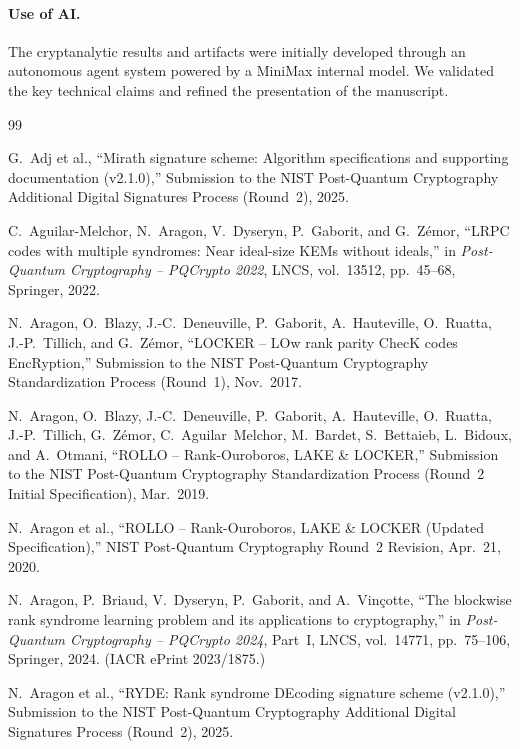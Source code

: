 \documentclass[11pt,a4paper]{article}
\theoremstyle{definition}
\theoremstyle{remark}
\begin{document}
\paragraph{Use of AI.}
The cryptanalytic results and artifacts were initially developed through an autonomous agent system powered by a MiniMax internal model. We validated the key technical claims and refined the presentation of the manuscript.

\begin{thebibliography}{99}

G.~Adj et al.,
``Mirath signature scheme: Algorithm specifications and supporting documentation (v2.1.0),'' Submission to the NIST Post-Quantum Cryptography Additional Digital Signatures Process (Round~2), 2025.

C.~Aguilar-Melchor, N.~Aragon, V.~Dyseryn, P.~Gaborit, and G.~Z\'{e}mor,
``LRPC codes with multiple syndromes: Near ideal-size KEMs without ideals,'' in \emph{Post-Quantum Cryptography -- PQCrypto 2022}, LNCS, vol.~13512, pp.~45--68, Springer, 2022.

N.~Aragon, O.~Blazy, J.-C.~Deneuville, P.~Gaborit, A.~Hauteville, O.~Ruatta, J.-P.~Tillich, and G.~Z\'{e}mor,
``LOCKER -- LOw rank parity ChecK codes EncRyption,'' Submission to the NIST Post-Quantum Cryptography Standardization Process (Round~1), Nov.~2017.

N.~Aragon, O.~Blazy, J.-C.~Deneuville, P.~Gaborit, A.~Hauteville, O.~Ruatta, J.-P.~Tillich, G.~Z\'{e}mor, C.~Aguilar~Melchor, M.~Bardet, S.~Bettaieb, L.~Bidoux, and A.~Otmani,
``ROLLO -- Rank-Ouroboros, LAKE \& LOCKER,'' Submission to the NIST Post-Quantum Cryptography Standardization Process (Round~2 Initial Specification), Mar.~2019.

N.~Aragon et al.,
``ROLLO -- Rank-Ouroboros, LAKE \& LOCKER (Updated Specification),'' NIST Post-Quantum Cryptography Round~2 Revision, Apr.~21, 2020.

N.~Aragon, P.~Briaud, V.~Dyseryn, P.~Gaborit, and A.~Vin\c{c}otte,
``The blockwise rank syndrome learning problem and its applications to cryptography,'' in \emph{Post-Quantum Cryptography -- PQCrypto 2024}, Part~I, LNCS, vol.~14771, pp.~75--106, Springer, 2024. (IACR ePrint 2023/1875.)

N.~Aragon et al.,
``RYDE: Rank syndrome DEcoding signature scheme (v2.1.0),'' Submission to the NIST Post-Quantum Cryptography Additional Digital Signatures Process (Round~2), 2025.


\end{thebibliography}
\end{document}
